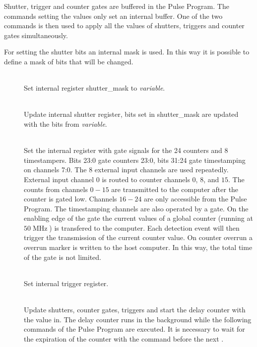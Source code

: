\documentclass[11pt]{scrartcl}
\newcommand{\unit}[1]{\ensuremath{\operatorname{#1}}}
\begin{document}
Shutter, trigger and counter gates are buffered in the Pulse Program. The commands setting the values only set an internal buffer. One of the two  commands is then used to apply all the values of shutters, triggers and counter gates simultaneously.

For setting the shutter bits an internal mask is used. In this way it is possible to define a mask of bits that will be changed.
\begin{addmargin}{1cm}
\begin{description}
\item[ ]  \hfill\\  
Set internal register shutter\_mask to {\it variable}.

\item[ ]  \hfill\\  
Update internal shutter register, bits set in shutter\_mask are updated with the bits from {\it variable}.

\item[ ]  \hfill\\  
Set the internal register with gate signals for the 24 counters and 8 timestampers. Bits 23:0 gate counters 23:0, bits 31:24 gate  timestamping on channels 7:0. The $8$ external input channels are used repeatedly. External input channel $0$ is routed to counter channels $0$, $8$, and $15$. The counts from channels $0 - 15$ are transmitted to the computer after the counter is gated low. Channels $16-24$ are only accessible from the Pulse Program. The timestamping channels are also operated by a gate. On the enabling edge of the gate the current values of a global counter (running at $50\unit{MHz}$) is transfered to the computer. Each detection event will then trigger the transmission of the current counter value. On counter overrun a overrun marker is written to the host computer. In this way, the total time of the gate is not limited.

\item[ ] \hfill\\   
Set internal trigger register.

\item[  ]  \hfill\\  
Update shutters, counter gates, triggers and start the delay counter with the value in. The delay counter runs in the background while the following commands of the Pulse Program are executed. It is necessary to wait for the expiration of the counter with the  command before the next .


\end{description}
\end{addmargin}
\end{document}
